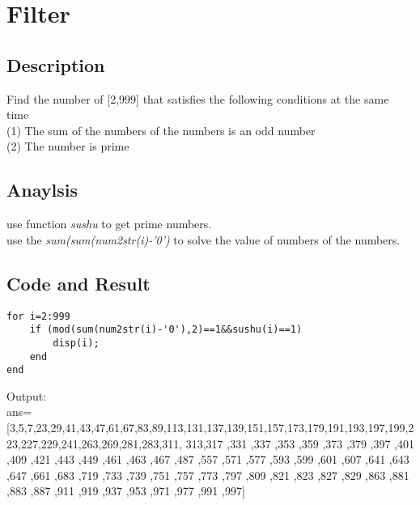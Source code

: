 \documentclass[UTF8,a4paper]{article}
\begin{document}
\section{Filter}
\subsection{Description}
\noindent Find the number of [2,999] that satisfies the following conditions at the same time\\
(1) The sum of the numbers of the numbers is an odd number\\
(2) The number is prime
\subsection{Anaylsis}
\noindent use function \textit{sushu} to get prime numbers.\\
use the \textit{sum(sum(num2str(i)-'0')} to solve the value of numbers of the numbers.
\subsection{Code and Result}
\begin{lstlisting}
for i=2:999
    if (mod(sum(num2str(i)-'0'),2)==1&&sushu(i)==1)
        disp(i);
    end
end
\end{lstlisting}
Output:\\
ans=
[3,5,7,23,29,41,43,47,61,67,83,89,113,131,137,139,151,157,173,179,191,193,197,199,223,227,229,241,263,269,281,283,311,
313,317
   ,331
   ,337
   ,353
   ,359
   ,373
   ,379
   ,397
   ,401
   ,409
   ,421
   ,443
   ,449
   ,461
   ,463
   ,467
   ,487
   ,557
   ,571
   ,577
   ,593
   ,599
   ,601
   ,607
   ,641
   ,643
   ,647
   ,661
   ,683
   ,719
   ,733
   ,739
   ,751
   ,757
   ,773
   ,797
   ,809
   ,821
   ,823
   ,827
   ,829
   ,863
   ,881
   ,883
   ,887
   ,911
   ,919
   ,937
   ,953
   ,971
   ,977
   ,991
   ,997]
\end{document}
